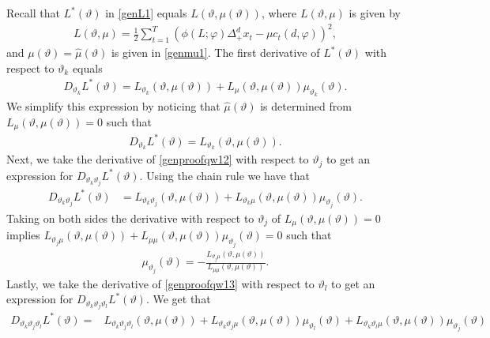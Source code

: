 {{Recall that $L^*(\vartheta)$ in \eqref{genL1} equals $L(\vartheta,\mu(\vartheta))$, where $L(\vartheta,\mu) $ is given by 
\begin{align*}
      L(\vartheta,\mu) = \frac{1}{2} \sum_{t = 1}^T \left(  \phi(L;\varphi)\Delta_{+}^{d} x_t- \mu  c_t(d,\varphi)  \right)^2,
\end{align*}
and $\mu(\vartheta) = \hat{\mu}(\vartheta)$ is given in \eqref{genmu1}. The first derivative of $L^*(\vartheta)$ with respect to $\vartheta_k$ equals
\begin{align*}
    D_{\vartheta_k} L^*(\vartheta) =  L_{\vartheta_k}(\vartheta,\mu(\vartheta)) +  L_{\mu}(\vartheta,\mu(\vartheta)) \mu_{\vartheta_k}(\vartheta). 
\end{align*}
We simplify this expression by noticing that $\hat{\mu}(\vartheta)$ is determined from $L_{\mu}(\vartheta,\mu(\vartheta)) = 0$ such that 
\begin{align}
    D_{\vartheta_k} L^*(\vartheta) =  L_{\vartheta_k}(\vartheta,\mu(\vartheta)).  \label{genproofqw12}
\end{align}
Next, we take the derivative of \eqref{genproofqw12} with respect to $ \vartheta_j$ to get an expression for $D_{\vartheta_k \vartheta_j} L^*(\vartheta)$. Using the chain rule we have that 
\begin{align}
   D_{\vartheta_k \vartheta_j } L^*(\vartheta) &=  L_{\vartheta_k  \vartheta_j}(\vartheta,\mu(\vartheta)) + L_{\vartheta_k \mu}(\vartheta,\mu(\vartheta)) \mu_{\vartheta_j}(\vartheta). \label{genproofqw13}
\end{align}
Taking on both sides the derivative with respect to $\vartheta_j$ of $L_{\mu}(\vartheta,\mu(\vartheta)) = 0$ implies $L_{ \vartheta_j \mu}(\vartheta,\mu(\vartheta)) + L_{\mu \mu}(\vartheta,\mu(\vartheta)) \mu_{\vartheta_j}(\vartheta) = 0$ such that
\begin{align*}
    \mu_{\vartheta_j}(\vartheta) = -\frac{L_{\vartheta_j \mu}(\vartheta,\mu(\vartheta))}{L_{\mu \mu}(\vartheta,\mu(\vartheta)) }. 
\end{align*} 
Lastly, we take the derivative of \eqref{genproofqw13} with respect to $\vartheta_l$ to get an expression for $ D_{\vartheta_k \vartheta_j \vartheta_l } L^*(\vartheta)$. We get that 
\begin{align}
D_{\vartheta_k \vartheta_j \vartheta_l } L^*(\vartheta) = &L_{\vartheta_k  \vartheta_j \vartheta_l}(\vartheta,\mu(\vartheta)) +  L_{\vartheta_k  \vartheta_j \mu}(\vartheta,\mu(\vartheta)) \mu_{\vartheta_l}(\vartheta) +  L_{\vartheta_k  \vartheta_l \mu}(\vartheta,\mu(\vartheta)) \mu_{\vartheta_j}(\vartheta) \nonumber \\

\end{align}}}
